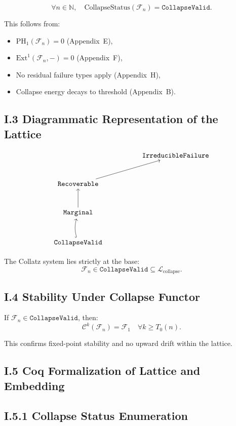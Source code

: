 \documentclass[11pt]{article}
\begin{document}
\[
\forall n \in \mathbb{N},\quad \text{CollapseStatus}(\mathcal{F}_n) = \texttt{CollapseValid}.
\]

\noindent This follows from:
\begin{itemize}
  \item \( \mathrm{PH}_1(\mathcal{F}_n) = 0 \) (Appendix~E),
  \item \( \mathrm{Ext}^1(\mathcal{F}_n, -) = 0 \) (Appendix~F),
  \item No residual failure types apply (Appendix~H),
  \item Collapse energy decays to threshold (Appendix~B).
\end{itemize}

\subsection*{I.3 Diagrammatic Representation of the Lattice}

\[
\begin{tikzcd}[row sep=large, column sep=huge]
& \texttt{IrreducibleFailure} \\
\texttt{Recoverable} \arrow[ur] \\
\texttt{Marginal} \arrow[u] \\
\texttt{CollapseValid} \arrow[u, hookrightarrow, bend left=15]
\end{tikzcd}
\]

\noindent The Collatz system lies strictly at the base:
\[
\mathcal{F}_n \in \texttt{CollapseValid} \subseteq \mathcal{L}_{\mathrm{collapse}}.
\]

\subsection*{I.4 Stability Under Collapse Functor}

If \( \mathcal{F}_n \in \texttt{CollapseValid} \), then:
\[
\mathcal{C}^k(\mathcal{F}_n) = \mathcal{F}_1 \quad \forall k \geq T_0(n).
\]

\noindent This confirms fixed-point stability and no upward drift within the lattice.

\subsection*{I.5 Coq Formalization of Lattice and Embedding}

\subsection*{I.5.1 Collapse Status Enumeration}
\end{document}
